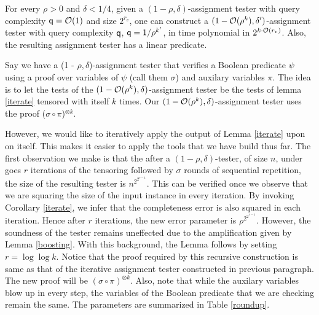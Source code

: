 \begin{lemma}\label{Camplify}
  For every $\rho > 0$ and $\delta < 1/4$, given a $(1 - \rho,
  \delta)$-assignment tester with query complexity ${\sf q} = {\cal O}(1)$
  and size $2^{r_v}$, one can construct a $(1 - {\cal
    O}(\rho^k),\delta')$-assignment tester with query complexity ${\sf q}$,
  ${\sf q} = 1/\rho^{k'}$, in time polynomial in $2^{ k \cdot {\cal
      O}(r_v)}$. Also, the resulting assignment tester has a linear
  predicate.
\end{lemma}
 Say we have a (1 - $\rho, \delta$)-assignment tester
that verifies a Boolean predicate $\psi$ using a proof over variables
of $\psi$ (call them $\sigma$) and auxilary variables $\pi$. The idea is to
let the tests of the $(1 - {\cal O}(\rho^k),\delta)$-assignment 
tester be the tests of lemma \ref{iterate} tensored with itself $k$ times. 
Our $(1 - {\cal O}(\rho^k),\delta)$-assignment 
tester uses the proof ($\sigma \circ \pi$)$^{\otimes k}$.

However, we would like to iteratively apply the output of Lemma
\ref{iterate} upon on itself. This makes it easier to apply the tools
that we have build thus far. The first observation we make is that the
after a $(1 - \rho, \delta)$-tester, of size $n$, under goes $r$
iterations of the tensoring followed by $\sigma$ rounds of sequential
repetition, the size of the resulting tester is
$n^{2^{2^{r-1}}}$. This can be verified once we observe that we are
squaring the size of the input instance in every iteration. By
invoking Corollary \ref{iterate}, we infer that the completeness error
is also squared in each iteration. Hence after $r$ iterations, the new
error parameter is $\rho^{2^{2^{r-1}}}$. However, the soundness of the
tester remains uneffected due to the amplification given by Lemma
\ref{boosting}. With this background, the Lemma follows by setting $ r
= \log \log k$. Notice that the proof required by this recursive
construction is same as that of the iterative assignment tester
constructed in previous paragraph.  The new proof will be $(\sigma
\circ \pi)^{\otimes k}$. Also, note that while the auxilary variables
blow up in every step, the variables of the Boolean predicate that we
are checking remain the same. The parameters are summarized in Table
\ref{roundup}.


